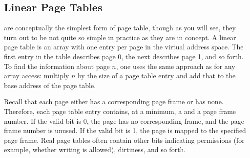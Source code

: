 \subsection{Linear Page Tables}\label{linear-page-tables-section}

 are conceptually the simplest form of page table, though as you will see,
they turn out to be not quite so simple in practice as they are in
concept.  A linear page table is an array with one entry per page in
the virtual address space.  The first entry in the table describes
page 0, the next describes page 1, and so forth.  To find the
information about page $n$, one uses the same approach as for any
array access: multiply $n$ by the size of a page table entry and add
that to the base address of the page table.

Recall that each page either has a corresponding page frame or has
none.  Therefore, each page table entry contains, at a minimum, a
 and a page frame number.  If the valid bit is 0, the
page has no corresponding frame, and the page frame number is unused.
If the valid bit is 1, the page is mapped to the specified page frame.
Real page tables often contain other bits indicating permissions
(for example, whether writing is allowed), dirtiness, and so forth.

